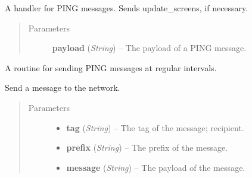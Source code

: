 \documentclass[letterpaper,10pt,english]{sphinxmanual}
\begin{document}
\begin{fulllineitems}

\begin{fulllineitems}
\label{swnp:swnp.SWNP.ping_handler}
A handler for PING messages. Sends update\_screens, if necessary.
\begin{quote}\begin{description}
\item[{Parameters}] \leavevmode
\textbf{payload} (\emph{String}) -- The payload of a PING message.

\end{description}\end{quote}

\end{fulllineitems}


\begin{fulllineitems}
\label{swnp:swnp.SWNP.ping_routine}
A routine for sending PING messages at regular intervals.

\end{fulllineitems}


\begin{fulllineitems}
\label{swnp:swnp.SWNP.send}
Send a message to the network.
\begin{quote}\begin{description}
\item[{Parameters}] \leavevmode\begin{itemize}
\item {} 
\textbf{tag} (\emph{String}) -- The tag of the message; recipient.

\item {} 
\textbf{prefix} (\emph{String}) -- The prefix of the message.

\item {} 
\textbf{message} (\emph{String}) -- The payload of the message.

\end{itemize}

\end{description}\end{quote}

\end{fulllineitems}


\end{fulllineitems}
\end{document}
